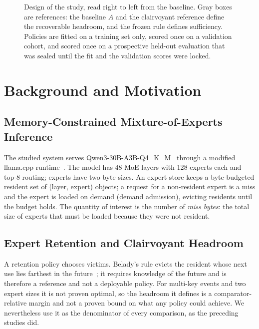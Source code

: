 \documentclass[11pt]{article}
\theoremstyle{plain}
\theoremstyle{definition}
\begin{document}
\begin{figure}[t]
\centering

\caption{Design of the study, read right to left from the baseline. Gray boxes are references: the baseline $A$ and the clairvoyant reference define the recoverable headroom, and the frozen rule defines sufficiency. Policies are fitted on a training set only, scored once on a validation cohort, and scored once on a prospective held-out evaluation that was sealed until the fit and the validation scores were locked.}
\label{fig:design}
\end{figure}

\section{Background and Motivation}
\label{sec:background}

\subsection{Memory-Constrained Mixture-of-Experts Inference}
\label{sec:bg-moe}
The studied system serves Qwen3-30B-A3B-Q4\_K\_M~\cite{qwen3technicalreport} through a modified llama.cpp runtime~\cite{gerganov2023llamacpp}. The model has 48 MoE layers with 128 experts each and top-8 routing; experts have two byte sizes. An expert store keeps a byte-budgeted resident set of (layer, expert) objects; a request for a non-resident expert is a miss and the expert is loaded on demand (demand admission), evicting residents until the budget holds. The quantity of interest is the number of \emph{miss bytes}: the total size of experts that must be loaded because they were not resident.

\subsection{Expert Retention and Clairvoyant Headroom}
\label{sec:bg-headroom}
A retention policy chooses victims. Belady's rule evicts the resident whose next use lies farthest in the future~\cite{belady1966replacement}; it requires knowledge of the future and is therefore a reference and not a deployable policy. For multi-key events and two expert sizes it is not proven optimal, so the headroom it defines is a comparator-relative margin and not a proven bound on what any policy could achieve. We nevertheless use it as the denominator of every comparison, as the preceding studies did.
\end{document}

